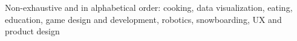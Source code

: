 \documentclass[10pt,a4paper]{article}
\begin{document}
\spacedhrule{1.6em}{-0.4em}


\inlineheadsection
  {Non-exhaustive and in alphabetical order:}
  {cooking, data visualization, eating, education, game design and development, robotics, snowboarding, UX and product design}












\end{document}
